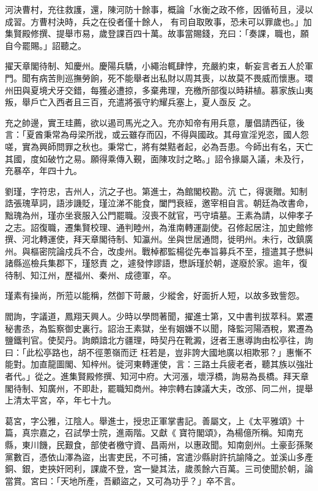 \begin{pinyinscope}
 河決曹村，充往救護，還，陳河防十餘事，概論「水衡之政不修，因循茍且，浸以成習。方曹村決時，兵之在役者僅十餘人，
 有司自取敗事，恐未可以罪歲也。」加集賢殿修撰、提舉市易，歲登課百四十萬。故事當賜錢，充曰：「奏課，職也，願自今罷賜。」詔聽之。



 擢天章閣待制、知慶州。慶陽兵驕，小繩治輒肆悖，充嚴約束，斬妄言者五人於軍門。聞有病苦則巡撫勞餉，死不能舉者出私財以周其喪，以故莫不畏威而懷惠。環州田與夏境犬牙交錯，每獲必遭掠，多棄弗理，充檄所部復以時耕植。慕家族山夷叛，舉戶亡入西者且三百，充遣將張守約耀兵塞上，夏人亟反
 之。



 充之帥邊，實王珪薦，欲以遏司馬光之入。充亦知帝有用兵意，屢倡請西征，後言：「夏酋秉常為母梁所戕，或云雖存而囚，不得與國政。其母宣淫兇恣，國人怨嗟，實為興師問罪之秋也。秉常亡，將有桀黠者起，必為吾患。今師出有名，天亡其國，度如破竹之易。願得乘傳入覲，面陳攻討之略。」詔令掾屬入議，未及行，充暴卒，年四十九。



 劉瑾，字符忠，吉州人，沆之子也。第進士，為館閣校勘。沆
 亡，得褒贈。知制誥張瑰草詞，語涉譏貶，瑾泣涕不能食，闔門衰絰，邀宰相自言。朝廷為改書命，黜瑰為州，瑾亦坐衰服入公門罷職。沒喪不就官，丐守墳墓。王素為請，以伸孝子之志。詔復職，遷集賢校理、通判睦州，為淮南轉運副使。召修起居注，加史館修撰、河北轉運使，拜天章閣待制、知瀛州。坐與世居通問，徙明州。未行，改鎮廣州。與樞密院論戍兵不合，改虔州。戰棹都監楊從先奉旨募兵不至，擅遣其子懋糾諸縣巡檢兵集郡下，瑾怒責
 之，遽發悖謬語，懋訴瑾於朝，遂廢於家。逾年，復待制、知江州，歷福州、秦州、成德軍，卒。



 瑾素有操尚，所蒞以能稱，然御下苛嚴，少縱舍，好面折人短，以故多致訾怨。



 閻詢，字議道，鳳翔天興人。少時以學問著聞，擢進士第，又中書判拔萃科。累遷秘書丞，為監察御史裏行。詔治王素獄，坐有姻嫌不以聞，降監河陽酒稅，累遷為鹽鐵判官。使契丹。詢頗諳北方疆理，時契丹在靴澱，迓者王惠導詢由松亭往，詢曰：「此松亭路也，胡不徑蔥嶺而迂
 枉若是，豈非誇大國地廣以相欺邪？」惠慚不能對。加直龍圖閣、知梓州。徙河東轉運使，言：三路土兵疲老者，聽其族以強壯者代。」從之。進集賢殿修撰、知河中府。大河漲，壞浮橋，詢易為長橋。拜天章閣待制、知廣州，不即赴，罷職知商州。神宗轉右諫議大夫，改邠、同二州，提舉上清太平宮，卒，年七十九。



 葛宮，字公雅，江陰人。舉進士，授忠正軍掌書記。善屬文，上《太平雅頌》十篇，真宗嘉之，召試學士院，進兩階。又獻《
 寶符閣頌》，為楊億所稱。知南充縣，東川饑，民艱食，部使者檄守資、昌兩州，以惠政聞。知南劍州。土豪彭孫聚黨數百，憑依山澤為盜，出害吏民，不可捕，宮遣沙縣尉許抗諭降之。並溪山多產銅、銀，吏挾奸罔利，課歲不登，宮一變其法，歲羨餘六百萬。三司使聞於朝，論當賞。宮曰：「天地所產，吾顧盜之，又可為功乎？」卒不言。




\end{pinyinscope}
